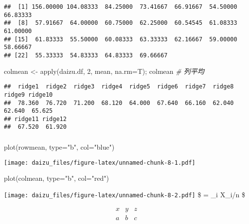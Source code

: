 \documentclass[
]{article}
\newenvironment{Shaded}{\begin{snugshade}}{\end{snugshade}}
\newcommand{\AttributeTok}[1]{\textcolor[rgb]{0.77,0.63,0.00}{#1}}
\newcommand{\CommentTok}[1]{\textcolor[rgb]{0.56,0.35,0.01}{\textit{#1}}}
\newcommand{\DecValTok}[1]{\textcolor[rgb]{0.00,0.00,0.81}{#1}}
\newcommand{\FunctionTok}[1]{\textcolor[rgb]{0.00,0.00,0.00}{#1}}
\newcommand{\NormalTok}[1]{#1}
\newcommand{\OtherTok}[1]{\textcolor[rgb]{0.56,0.35,0.01}{#1}}
\newcommand{\StringTok}[1]{\textcolor[rgb]{0.31,0.60,0.02}{#1}}
\begin{document}
\begin{verbatim}
##  [1] 156.00000 104.08333  84.25000  73.41667  66.91667  54.50000  66.83333
##  [8]  57.91667  64.00000  60.75000  62.25000  60.54545  61.08333  61.00000
## [15]  61.83333  55.50000  60.08333  63.33333  62.16667  59.00000  58.66667
## [22]  55.33333  54.83333  64.83333  69.66667
\end{verbatim}

\begin{Shaded}
\begin{Highlighting}[]
\NormalTok{    colmean }\OtherTok{\textless{}{-}} \FunctionTok{apply}\NormalTok{(daizu.df, }\DecValTok{2}\NormalTok{, mean, }\AttributeTok{na.rm=}\NormalTok{T); colmean       }\CommentTok{\# 列平均}
\end{Highlighting}
\end{Shaded}

\begin{verbatim}
##  ridge1  ridge2  ridge3  ridge4  ridge5  ridge6  ridge7  ridge8  ridge9 ridge10 
##  78.360  76.720  71.200  68.120  64.000  67.640  66.160  62.040  62.640  65.625 
## ridge11 ridge12 
##  67.520  61.920
\end{verbatim}

\hypertarget{section}{%
\subsubsection{}\label{section}}

\begin{Shaded}
\begin{Highlighting}[]
    \FunctionTok{plot}\NormalTok{(rowmean, }\AttributeTok{type=}\StringTok{"b"}\NormalTok{, }\AttributeTok{col=}\StringTok{"blue"}\NormalTok{) }
\end{Highlighting}
\end{Shaded}

\texttt{[image: daizu\_files/figure-latex/unnamed-chunk-8-1.pdf]}

\begin{Shaded}
\begin{Highlighting}[]
    \FunctionTok{plot}\NormalTok{(colmean, }\AttributeTok{type=}\StringTok{"b"}\NormalTok{, }\AttributeTok{col=}\StringTok{"red"}\NormalTok{)}
\end{Highlighting}
\end{Shaded}

\texttt{[image: daizu\_files/figure-latex/unnamed-chunk-8-2.pdf]} \$
 = \Sigma\_i X\_i/n \$

\[ 
\begin{array}{ccc}
x & y & z \\
a & b & c \\
\end{array} 
\]
\end{document}
